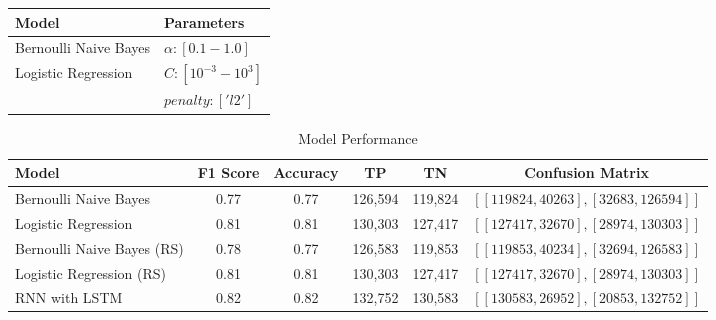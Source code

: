 \documentclass{article}
\begin{document}
\begin{multicols}{2}
\begin{center}
\small 
\begin{tabular}{ll}  
\toprule
\textbf{Model} & \textbf{Parameters} \\ 
\midrule
Bernoulli Naive Bayes & \(\alpha: [0.1{-}1.0]\) \\ 
Logistic Regression & \(C: [10^{-3}{-}10^3]\) \\ 
   & \(penalty: ['l2']\) \\
\bottomrule
\end{tabular}
\label{tab:hyperparameters}
\end{center}

\begin{table*}[t]
\small
\centering
\begin{tabular}{lccccc}
\toprule
\textbf{Model}                    & \textbf{F1 Score} & \textbf{Accuracy} & \textbf{TP} & \textbf{TN} & \textbf{Confusion Matrix}                                             \\ 
\midrule
Bernoulli Naive Bayes             & 0.77                     & 0.77                     & 126,594                    & 119,824                    & \([ [119824, 40263], [32683, 126594] ]\)                                \\ 
Logistic Regression               & 0.81                     & 0.81                     & 130,303                    & 127,417                    & \([ [127417, 32670], [28974, 130303] ]\)                                \\ 
Bernoulli Naive Bayes (RS)        & 0.78                     & 0.77                     & 126,583                    & 119,853                    & \([ [119853, 40234], [32694, 126583] ]\)                                \\ 
Logistic Regression (RS)          & 0.81                     & 0.81                     & 130,303                    & 127,417                    & \([ [127417, 32670], [28974, 130303] ]\)                                \\ 
RNN with LSTM                     & 0.82                     & 0.82                     & 132,752                    & 130,583                    & \([ [130583, 26952], [20853, 132752] ]\)                              \\ 
\bottomrule
\end{tabular}
\caption{Model Performance}
\label{tab:model_performance}
\end{table*}


\end{multicols}
\end{document}
